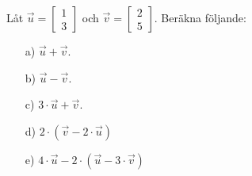 Låt $\vec{u} = \begin{bmatrix} 1 \\ 3 \end{bmatrix}$ och $\vec{v} = \begin{bmatrix} 2 \\ 5 \end{bmatrix}$. Beräkna följande:
\begin{itemize}
\item[a) ] $\vec{u} + \vec{v}$.
\item[b) ] $\vec{u} - \vec{v}$.
\item[c) ] $3 \cdot \vec{u} + \vec{v}$.
\item[d) ] $2 \cdot(\vec{v} - 2 \cdot \vec{u})$
\item[e) ] $4 \cdot \vec{u} -2 \cdot (\vec{u} -3 \cdot \vec{v})$
\end{itemize} 
